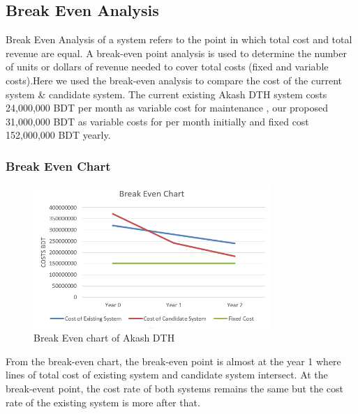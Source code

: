 \begin{spacing}{1}
\subsection{Break Even Analysis}
Break Even Analysis of a system refers to the point in which total cost and total revenue are equal. A break-even point analysis is used to determine the number of units or dollars of revenue needed to cover total costs (fixed and variable costs).Here we used the break-even analysis to compare the cost of the current system \& candidate system.
The current existing Akash DTH system costs 24,000,000 BDT per month as variable cost for maintenance , our proposed 31,000,000 BDT as variable costs for per month initially and fixed cost 152,000,000 BDT yearly.

\subsubsection{Break Even Chart}
\begin{figure}[H]
	\centering
	\includegraphics[width=0.8\textwidth]{break}
	\caption {Break Even chart of Akash DTH}
	\label{fig:break}
\end{figure}
From the break-even chart, the break-even point is almost at the year 1 where lines of total cost of existing system and candidate system intersect. At the break-event point, the cost rate of both systems remains the same but the cost rate of the existing system is more after that.



\end{spacing}
